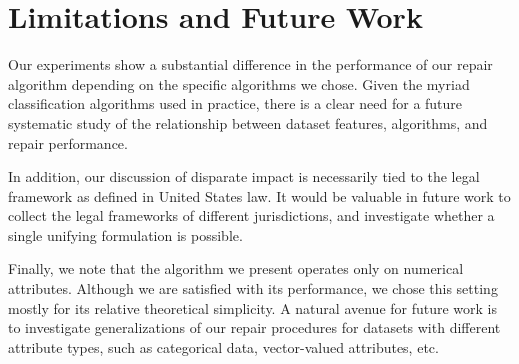 \section{Limitations and Future Work}

Our experiments show a substantial difference in the performance of
our repair algorithm depending on the specific algorithms we
chose. Given the myriad classification algorithms used in practice,
there is a clear need for a future systematic study of the
relationship between dataset features, algorithms, and repair
performance.


In addition, our discussion of disparate impact is necessarily tied to
the legal framework as defined in United States law. It would be
valuable in future work to collect the legal frameworks of different
jurisdictions, and investigate whether a single unifying formulation
is possible.


Finally, we note that the algorithm we present operates only on numerical
attributes. Although we are satisfied with its performance, we chose
this setting mostly for its relative theoretical simplicity. A natural
avenue for future work is to investigate generalizations of our repair
procedures for datasets with different attribute types, such as
categorical data, vector-valued attributes, etc.

